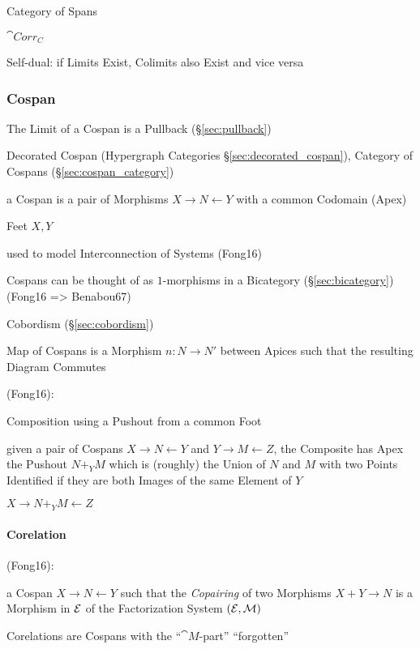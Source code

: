 Category of Spans

$\cat{Corr_C}$

Self-dual: if Limits Exist, Colimits also Exist and vice versa



\subsubsection{Cospan}\label{sec:cospan}

The Limit of a Cospan is a Pullback (\S\ref{sec:pullback})

\fist Decorated Cospan (Hypergraph Categories
\S\ref{sec:decorated_cospan}), Category of Cospans
(\S\ref{sec:cospan_category})

a Cospan is a pair of Morphisms $X \rightarrow N \leftarrow Y$ with a
common Codomain (Apex)

Feet $X,Y$

used to model Interconnection of Systems (Fong16)

Cospans can be thought of as $1$-morphisms in a Bicategory
(\S\ref{sec:bicategory}) (Fong16 => Benabou67)

Cobordism (\S\ref{sec:cobordism})

Map of Cospans is a Morphism $n : N \rightarrow N'$ between Apices
such that the resulting Diagram Commutes

(Fong16):

Composition using a Pushout from a common Foot

given a pair of Cospans $X \rightarrow N \leftarrow Y$ and $Y
\rightarrow M \leftarrow Z$, the Composite has Apex the Pushout $N +_Y
M$ which is (roughly) the Union of $N$ and $M$ with two Points
Identified if they are both Images of the same Element of $Y$

$X \rightarrow N +_Y M \leftarrow Z$



\paragraph{Corelation}\label{sec:corelation}\hfill

(Fong16):

a Cospan $X \rightarrow N \leftarrow Y$ such that the \emph{Copairing}
of two Morphisms $X + Y \rightarrow N$ is a Morphism in $\mathcal{E}$ of
the Factorization System $(\mathcal{E}, \mathcal{M})$ %

Corelations are Cospans with the ``$\cat{M}$-part'' ``forgotten''

